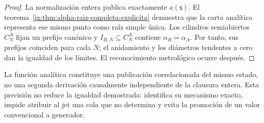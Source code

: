 \begin{proof}
La normalización entera publica exactamente \(a(\mathsf s)\). El
teorema~\ref{ix:thm:alpha-raiz-completa-explicita} demuestra que la carta
analítica representa ese mismo punto como raíz simple única. Los
cilindros semiabiertos \(C_N^A\) fijan un prefijo canónico y
\(I_{B,N}\subseteq C_N^A\) contiene \(\alpha_B=\alpha_A\). Por tanto, sus
prefijos coinciden para cada \(N\); el anidamiento y los diámetros tendentes a
cero dan la igualdad de los límites. El reconocimiento
metrológico ocurre después.
\end{proof}

La función analítica constituye una publicación correlacionada del mismo
estado, no una segunda derivación causalmente independiente de la clausura
entera. Esta precisión no reduce la igualdad demostrada: identifica su
mecanismo exacto, impide atribuir al jet una cola que no determina y evita la
promoción de un valor convencional a generador.


\endinput

\subsubsection{Lector completo, naturalidad y cilindros comunes}

Sea \(F_{\mathsf s}\) el cuerpo de coeficientes de la firma de
\(\mathsf s\in\mathcal X_\alpha^{\mathrm{enr}}\) y sea \(d_m=6+3m\). Se
definen
\[
 \mathfrak J_m:=\coprod_{\mathsf s\in\mathcal X_\alpha^{\mathrm{enr}}}
 \{\mathsf s\}\times F_{\mathsf s}[X]/(X^{d_m+1}),\qquad
 \Gamma_m(\mathsf s)=
 \bigl(\mathsf s,E_{21/22}^{(d_m)}(\mathsf s;X)\bigr).
\]
El lector completo registrado \(\Gamma_{E21}\) produce estas publicaciones.
Para \(m'\ge m\), el truncamiento
\(
 \tau_{m',m}(\mathsf s,[f]_{d_{m'}})
 =(\mathsf s,[f]_{d_m})
\)
satisface
\begin{equation}
 \tau_{m',m}\circ\Gamma_{m'}=\Gamma_m,
 \qquad
 E_{21/22}:=\varprojlim_mE_{21/22}^{(d_m)}.
 \tag{A3}
 \label{ix:eq:alpha-sistema-analitico-completo}
\end{equation}
No se añade una sección del truncamiento desnudo. Si se explicita la
publicación de los tres coeficientes siguientes, ésta es la proyección
derivada
\[
 \Lambda_{d_m+1:d_m+3}
 :=\operatorname{pr}_{d_m+1:d_m+3}\circ
   \Gamma_{E21}\circ\mathcal U_{\mathrm{TPK}},
\]
no un generador independiente ni una lectura del valor objetivo.


